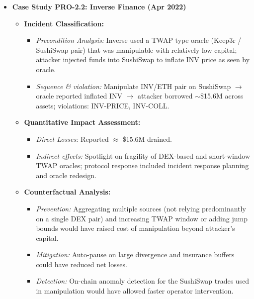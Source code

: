 \begin{itemize}
\begin{itemize}
\begin{itemize}
                \end{itemize}
        \end{itemize}
    \item \textbf{Case Study PRO-2.2: Inverse Finance (Apr 2022)}
        \begin{itemize}
            \item \textbf{Incident Classification:}
                \begin{itemize}
                    \item \textit{Precondition Analysis:} Inverse used a TWAP type oracle (Keep3r / SushiSwap pair) that was manipulable with relatively low capital; attacker injected funds into SushiSwap to inflate INV price as seen by oracle.
                    \item \textit{Sequence \& violation:} Manipulate INV/ETH pair on SushiSwap $\rightarrow$ oracle reported inflated INV $\rightarrow$ attacker borrowed $\sim$\$15.6M across assets; violations: INV-PRICE, INV-COLL.
                \end{itemize}
            \item \textbf{Quantitative Impact Assessment:}
                \begin{itemize}
                    \item \textit{Direct Losses:} Reported $\approx$ \$15.6M drained. 
                    \item \textit{Indirect effects:} Spotlight on fragility of DEX-based and short-window TWAP oracles; protocol response included incident response planning and oracle redesign.
                \end{itemize}
            \item \textbf{Counterfactual Analysis:}
                \begin{itemize}
                    \item \textit{Prevention:} Aggregating multiple sources (not relying predominantly on a single DEX pair) and increasing TWAP window or adding jump bounds would have raised cost of manipulation beyond attacker's capital.
                    \item \textit{Mitigation:} Auto-pause on large divergence and insurance buffers could have reduced net losses.
                    \item \textit{Detection:} On-chain anomaly detection for the SushiSwap trades used in manipulation would have allowed faster operator intervention.
                \end{itemize}
        \end{itemize}
\end{itemize}

